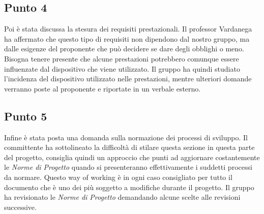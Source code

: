     \subsection{Punto 4}
        Poi è stata discussa la stesura dei requisiti prestazionali. Il professor Vardanega ha affermato che questo tipo di requisiti non dipendono dal nostro gruppo, ma dalle esigenze del proponente che può decidere se dare degli obblighi o meno. Bisogna tenere presente che alcune prestazioni potrebbero comunque essere influenzate dal dispositivo che viene utilizzato. Il gruppo ha quindi studiato l'incidenza del dispositivo utilizzato nelle prestazioni, mentre ulteriori domande verranno poste al proponente e riportate in un verbale esterno.
    \subsection{Punto 5}
        Infine è stata posta una domanda sulla normazione dei processi di sviluppo. Il committente ha sottolineato la difficoltà di stilare questa sezione in questa parte del progetto\glo, consiglia quindi un approccio che punti ad aggiornare costantemente le \textit{Norme di Progetto} quando si presenteranno effettivamente i suddetti processi da normare. Questo way of working è in ogni caso consigliato per tutto il documento che è uno dei più soggetto a modifiche durante il progetto\glo. Il gruppo ha revisionato le \textit{Norme di Progetto} demandando alcune scelte alle revisioni successive.